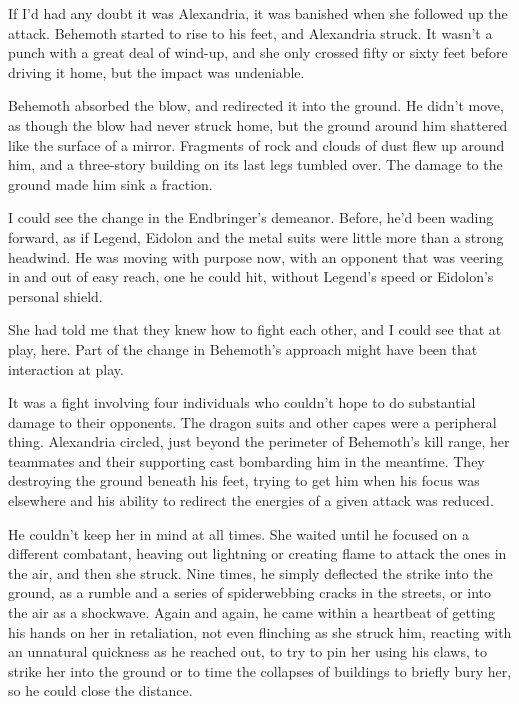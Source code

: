 





If I'd had any doubt it was Alexandria, it was banished when she followed up the attack.  Behemoth started to rise to his feet, and Alexandria struck.  It wasn't a punch with a great deal of wind-up, and she only crossed fifty or sixty feet before driving it home, but the impact was undeniable.



Behemoth absorbed the blow, and redirected it into the ground.  He didn't move, as though the blow had never struck home, but the ground around him shattered like the surface of a mirror.  Fragments of rock and clouds of dust flew up around him, and a three-story building on its last legs tumbled over.  The damage to the ground made him sink a fraction.



I could see the change in the Endbringer's demeanor.  Before, he'd been wading forward, as if Legend, Eidolon and the metal suits were little more than a strong headwind.  He was moving with purpose now, with an opponent that was veering in and out of easy reach, one he could hit, without Legend's speed or Eidolon's personal shield.



She had told me that they knew how to fight each other, and I could see that at play, here.  Part of the change in Behemoth's approach might have been that interaction at play.



It was a fight involving four individuals who couldn't hope to do substantial damage to their opponents.  The dragon suits and other capes were a peripheral thing.  Alexandria circled, just beyond the perimeter of Behemoth's kill range, her teammates and their supporting cast bombarding him in the meantime.  They destroying the ground beneath his feet, trying to get him when his focus was elsewhere and his ability to redirect the energies of a given attack was reduced.



He couldn't keep her in mind at all times.  She waited until he focused on a different combatant, heaving out lightning or creating flame to attack the ones in the air, and then she struck.  Nine times, he simply deflected the strike into the ground, as a rumble and a series of spiderwebbing cracks in the streets, or into the air as a shockwave.  Again and again, he came within a heartbeat of getting his hands on her in retaliation, not even flinching as she struck him, reacting with an unnatural quickness as he reached out, to try to pin her using his claws, to strike her into the ground or to time the collapses of buildings to briefly bury her, so he could close the distance.



